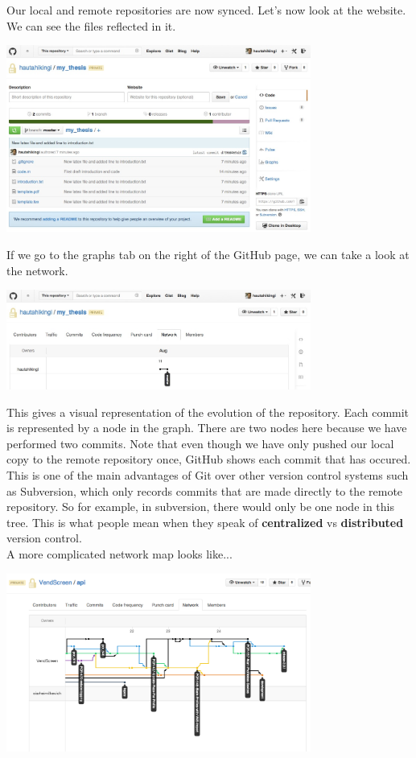 \documentclass{article}
\begin{document}
Our local and remote repositories are now synced. Let's now look at the website. We can see the files reflected in it.\\

\begin{center}
\includegraphics[width=10cm]{./auxfiles/Ghub3.jpg}
\end{center}

If we go to the graphs tab on the right of the GitHub page, we can take a look at the network.

\begin{center}
\includegraphics[width=10cm]{./auxfiles/Network.jpg}
\end{center}

This gives a visual representation of the evolution of the repository. Each commit is represented by a node in the graph. There are two nodes here because we have performed two commits. Note that even though we have only pushed our local copy to the remote repository once, GitHub shows each commit that has occured. This is one of the main advantages of Git over other version control systems such as Subversion, which only records commits that are made directly to the remote repository. So for example, in subversion, there would only be one node in this tree. This is what people mean when they speak of \textbf{centralized} vs \textbf{distributed} version control.\\

A more complicated network map looks like...\\

\begin{center}
\includegraphics[width=10cm]{./auxfiles/network_comp.png}
\end{center}
\end{document}
